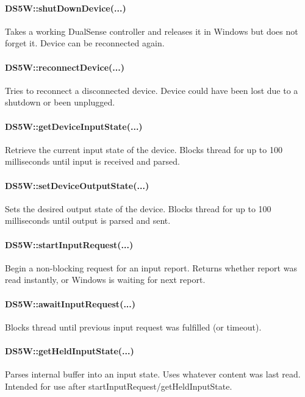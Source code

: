 \paragraph{DS5W::shutDownDevice(...)}
Takes a working DualSense controller and releases it in Windows but does not forget it. Device can be reconnected again.\\


\paragraph{DS5W::reconnectDevice(...)}
Tries to reconnect a disconnected device. Device could have been lost due to a shutdown or been unplugged.\\


\paragraph{DS5W::getDeviceInputState(...)}
Retrieve the current input state of the device. Blocks thread for up to 100 milliseconds until input is received and parsed.\\


\paragraph{DS5W::setDeviceOutputState(...)}
Sets the desired output state of the device.  Blocks thread for up to 100 milliseconds until output is parsed and sent.\\


\paragraph{DS5W::startInputRequest(...)}
Begin a non-blocking request for an input report. Returns whether report was read instantly, or Windows is waiting for next report.\\


\paragraph{DS5W::awaitInputRequest(...)}
Blocks thread until previous input request was fulfilled (or timeout). \\


\paragraph{DS5W::getHeldInputState(...)}
Parses internal buffer into an input state. Uses whatever content was last read. Intended for use after startInputRequest/getHeldInputState.\\


